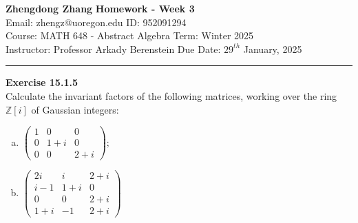 \documentclass[a4paper, 12pt]{article}
\newenvironment{problem}[2][Exercise]
    { \begin{mdframed}[backgroundcolor=gray!20] \textbf{#1 #2} \\}
    {  \end{mdframed}}
\begin{document}
\noindent
\large\textbf{Zhengdong Zhang} \hfill \textbf{Homework - Week 3}   \\
Email: zhengz@uoregon.edu \hfill ID: 952091294 \\
\normalsize Course: MATH 648 - Abstract Algebra  \hfill Term: Winter 2025\\
Instructor: Professor Arkady Berenstein \hfill Due Date: $29^{th}$ January, 2025 \\
\noindent\rule{7in}{2.8pt}
\begin{problem}{15.1.5}
Calculate the invariant factors of the following matrices, working over the ring \(\mathbb{Z}[i]\) of Gaussian integers:
\begin{multicols}{2}
\begin{enumerate}[(a)]
\item \(\begin{pmatrix}
    1&0&0\\ 
    0&1+i&0\\ 
    0&0&2+i
\end{pmatrix};\)
\item \(\begin{pmatrix}
    2i&i&2+i\\ 
    i-1&1+i&0\\ 
    0&0&2+i\\ 
    1+i&-1&2+i
\end{pmatrix}\)
\end{enumerate}
\end{multicols}
\end{problem}
\end{document}
